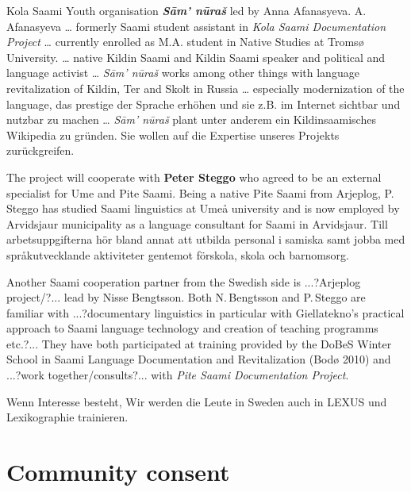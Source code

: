 \documentclass[a4paper,12pt]{article}
\begin{document}
{{{{%
Kola Saami Youth organisation \textit{\textbf{Sām' nūraš}}  led by Anna Afanasyeva. A.\,Afanasyeva … formerly Saami student assistant in {\it Kola Saami Documentation Project} … currently enrolled as M.A. student in Native Studies at Tromsø University. … native Kildin Saami and Kildin Saami speaker and political and language activist … {\it Sām' nūraš} works among other things with language revitalization of Kildin, Ter and Skolt in Russia … especially modernization of the language, das prestige der Sprache erhöhen und sie z.B. im Internet sichtbar und nutzbar zu machen … {\it Sām' nūraš} plant unter anderem ein Kildinsaamisches Wikipedia  zu gründen. Sie wollen auf die Expertise unseres Projekts zurückgreifen.

The project will cooperate with \textbf{Peter Steggo} who agreed to be an external specialist for Ume and Pite Saami. Being a native Pite Saami from Arjeplog, P.\,Steggo has studied Saami linguistics at Umeå university and is now employed by Arvidsjaur municipality as a language consultant for Saami in Arvidsjaur. Till arbetsuppgifterna hör bland annat att utbilda personal i samiska samt jobba med språkutvecklande aktiviteter gentemot förskola, skola och barnomsorg.

Another Saami cooperation partner from the Swedish side is ...?Arjeplog project/?... lead by Nisse Bengtsson. Both N.\,Bengtsson and P.\,Steggo are familiar with ...?documentary linguistics in particular with Giellatekno's practical approach to Saami language technology and creation of teaching programms etc.?... They have both participated at training provided by the DoBeS Winter School in Saami Language Documentation and Revitalization (Bodø 2010) and ...?work together/consults?... with {\it Pite Saami Documentation Project}. 

Wenn Interesse besteht, Wir werden die Leute in Sweden auch in LEXUS und Lexikographie trainieren.




\section{Community consent}

}}}}
\end{document}
